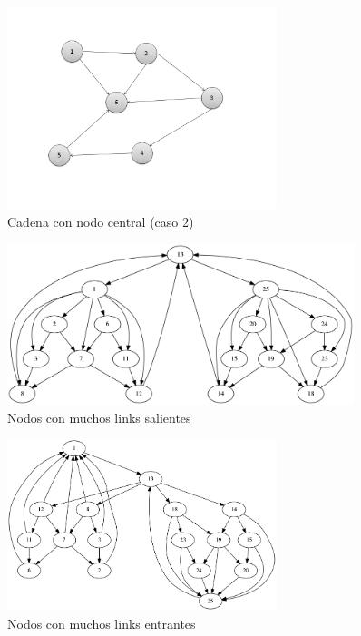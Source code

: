 \begin{figure}[H]
  \centering
    \includegraphics[width=0.7\textwidth]{img/Cadena6v2.png}
  \caption{Cadena con nodo central (caso 2)}
  \label{fig:Cadena con nodo central}
\end{figure}


\begin{figure}[H]
	\centering
	\includegraphics[width=0.9\textwidth]{img/links_salientes_25.png}
	\caption{Nodos con muchos links salientes}
	\label{fig:Nodos con muchos links salientes}
\end{figure}

\begin{figure}[H]
	\centering
	\includegraphics[width=0.7\textwidth]{img/links_entrantes_25.png}
	\caption{Nodos con muchos links entrantes}
	\label{fig:Nodos con muchos links entrantes}
\end{figure}
